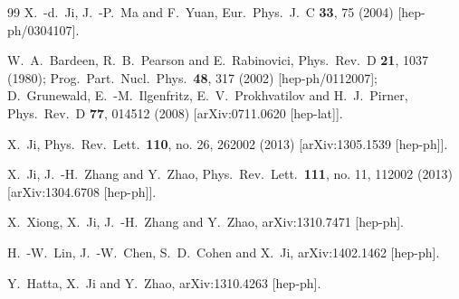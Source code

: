 \documentclass[aps,prd,preprint,tightenlines,superscriptaddress]{revtex4}
\begin{document}
\begin{thebibliography}{99}
  X.~-d.~Ji, J.~-P.~Ma and F.~Yuan,
  Eur.\ Phys.\ J.\ C {\bf 33}, 75 (2004)
  [hep-ph/0304107].

  W.~A.~Bardeen, R.~B.~Pearson and E.~Rabinovici,
  Phys.\ Rev.\ D {\bf 21}, 1037 (1980);
  Prog.\ Part.\ Nucl.\ Phys.\  {\bf 48}, 317 (2002)
  [hep-ph/0112007];
  D.~Grunewald, E.~-M.~Ilgenfritz, E.~V.~Prokhvatilov and H.~J.~Pirner,
  Phys.\ Rev.\ D {\bf 77}, 014512 (2008)
  [arXiv:0711.0620 [hep-lat]].


  X.~Ji,
  Phys.\ Rev.\ Lett.\  {\bf 110}, no. 26, 262002 (2013)
  [arXiv:1305.1539 [hep-ph]].

  X.~Ji, J.~-H.~Zhang and Y.~Zhao,
  Phys.\ Rev.\ Lett.\  {\bf 111}, no. 11, 112002 (2013)
  [arXiv:1304.6708 [hep-ph]].

  X.~Xiong, X.~Ji, J.~-H.~Zhang and Y.~Zhao,
  arXiv:1310.7471 [hep-ph].

  H.~-W.~Lin, J.~-W.~Chen, S.~D.~Cohen and X.~Ji,
  arXiv:1402.1462 [hep-ph].

  Y.~Hatta, X.~Ji and Y.~Zhao,
  arXiv:1310.4263 [hep-ph].


\end{thebibliography}
\end{document}
